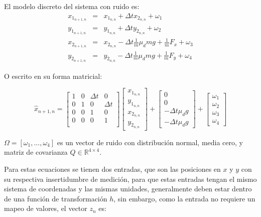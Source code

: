 El modelo discreto del sistema con ruido es:
\begin{eqnarray*}
x_{1_{n+1,n}} &=& x_{1_{n,n}} + \Delta t x_{2_{n,n}} + \omega_1\\ %
y_{1_{n+1,n}} &=& y_{1_{n,n}} + \Delta t y_{2_{n,n}} + \omega_2\\ %
x_{2_{n+1,n}} &=& x_{2_{n,n}} - \Delta t \frac{1}{m}\mu_d m g + \frac{1}{m} F_x + \omega_3\\ %
y_{2_{n+1,n}} &=& y_{2_{n,n}} - \Delta t \frac{1}{m}\mu_d m g + \frac{1}{m} F_y + \omega_4 %
\end{eqnarray*}

O escrito en su forma matricial:

\begin{equation}
\hat{x}_{n+1,n} =
\begin{bmatrix}
1 & 0 & \Delta t & 0\\ 
0 & 1 & 0 & \Delta t\\
0 & 0 & 1 & 0\\
0 & 0 & 0 & 1\\
\end{bmatrix}
\begin{bmatrix}
x_{1_{n,n}}\\ 
y_{1_{n,n}}\\
x_{2_{n,n}}\\
y_{2_{n,n}}
\end{bmatrix}
+
\begin{bmatrix}
0 \\
0 \\
- \Delta t \mu_d g \\
- \Delta t \mu_d g 
\end{bmatrix}
+
\begin{bmatrix}
\omega_1 \\ 
\omega_2 \\
\omega_3 \\
\omega_4
\end{bmatrix}
\end{equation}	

$\Omega = [\omega_1, ... ,\omega_4]$ es un vector de ruido con distribución normal, media cero, y matriz de covarianza $Q\in \mathbb{R}^{4\times 4}$.

Para estas ecuaciones se tienen dos entradas, que son las posiciones en $x$ y $y$ con su respectiva insertidumbre de medición, para que estas entradas tengan el mismo sistema de coordenadas y las mismas unidades, generalmente deben estar dentro de una función de transformación $h$, sin embargo, como la entrada no requiere un mapeo de valores, el vector $z_n$ es:


